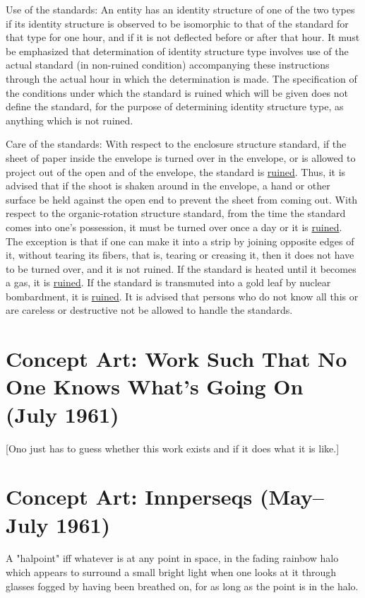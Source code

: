 Use of the standards: An entity has an identity structure
of one of the two types if its identity structure is observed 
to be isomorphic to that of the standard for that type for one
hour, and if it is not deflected before or after that hour. 
It must be emphasized that determination of identity structure
type involves use of the actual standard (in non-ruined condition)
accompanying these instructions through the actual hour
in which the determination is made. The specification of the
conditions under which the standard is ruined which will be 
given does not define the standard, for the purpose of determining
identity structure type, as anything which is not ruined. 

Care of the standards: With respect to the enclosure 
structure standard, if the sheet of paper inside the envelope
is turned over in the envelope, or is allowed to project out
of the open and of the envelope, the standard is \uline{ruined}. Thus, 
it is advised that if the shoot is shaken around in the envelope,
a hand or other surface be held against the open end to prevent
the sheet from coming out. With respect to the organic-rotation 
structure standard, from the time the standard comes into one's
possession, it must be turned over once a day or it is \uline{ruined}.
The exception is that if one can make it into a strip by
joining opposite edges of it, without tearing its fibers, that
is, tearing or creasing it, then it does not have to be turned
over, and it is not ruined. If the standard is heated until it
becomes a gas, it is \uline{ruined}. If the standard is transmuted into 
a gold leaf by nuclear bombardment, it is \uline{ruined}. It is advised
that persons who do not know all this or are careless or destructive
not be allowed to handle the standards.

\section{Concept Art: Work Such That No One Knows What's Going On (July 1961)}

[Ono just has to guess whether this work exists and if it does what it is like.]

\section{Concept Art: Innperseqs (May--July 1961)}

A "halpoint" iff whatever is at any point in space, in the fading rainbow halo which appears to surround a small bright light when one looks at it through glasses fogged by having been breathed on, for as long as the point is in the halo. 

